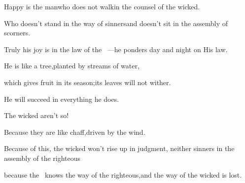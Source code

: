 
\begin{inparaenum}
  \pa {} Happy is the man\pa who does not walk\pa in the counsel of the wicked.%
  
  \pb Who doesn't stand in the way of sinners\pa and doesn't sit in the assembly of scorners.%
  
  \pa {} Truly his joy is in the law of the \lord~---\pa he ponders%
  day and night on His law.%
  
  \pa {} He is like a tree,\pa planted by streams of water,%
  
  \pb which gives fruit in its season;\pa its leaves will not wither.%
  
  \pb He will succeed in everything he does.%
  
  \pb {} The wicked aren't so!%
  
  \pb Because they are like chaff,\pa driven by the wind.%
  
  \pa {} Because of this, the wicked won't rise up in judgment,%
  \pa neither sinners in the assembly%
  of the righteous%
  
  \pa {} because the \lord\ knows the way of the righteous,\pa and the way of the wicked is lost.%
\end{inparaenum}
